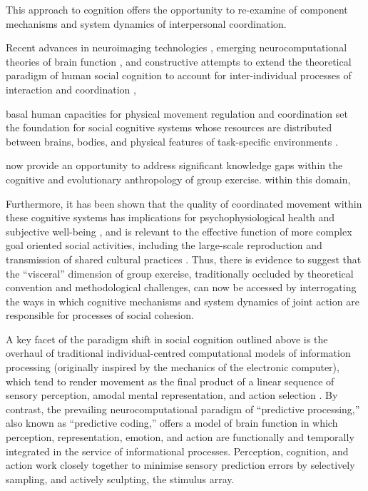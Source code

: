 \begin{CJK}{UTF8}{gbsn}
{This approach to cognition offers the opportunity to re-examine of component mechanisms and system dynamics of interpersonal coordination.


Recent advances in neuroimaging technologies \citep{Frith2007}, emerging neurocomputational theories of brain function \citep{Friston2010,Frith2010,Clark2013}, and constructive attempts to extend the theoretical paradigm of human social cognition to account for inter-individual processes of interaction and coordination \citep{Sebanz2006,Dale2014},

 basal human capacities for physical movement regulation and coordination set the foundation for social cognitive systems whose resources are distributed between brains, bodies, and physical features of task-specific environments \citep{Hutchins2000,Kirsh2006,Semin2008,Semin2012,Coey2012}.



now provide an opportunity to address significant knowledge gaps within the cognitive and evolutionary anthropology of group exercise.   within this domain,


Furthermore, it has been shown that the quality of coordinated movement within these cognitive systems has implications for psychophysiological health and subjective well-being \citep{Wheatley2012}, and is relevant to the effective function of more complex goal oriented social activities, including the large-scale reproduction and transmission of shared cultural practices \citep{Dunbar2012,Roepstorff2010,Claidiere2014,Launay2016}. Thus, there is evidence to suggest that the ``visceral'' dimension of group exercise, traditionally occluded by theoretical convention and methodological challenges, can now be accessed by interrogating the ways in which cognitive mechanisms and system dynamics of joint action are responsible for processes of social cohesion.

A key facet of the paradigm shift in social cognition outlined above is the overhaul of traditional individual-centred computational models of information processing (originally inspired by the mechanics of the electronic computer), which tend to render movement as the final product of a linear sequence of sensory perception, amodal mental representation, and action selection \citep{Lewis2005}.  By contrast, the prevailing neurocomputational paradigm of ``predictive processing,'' also known as ``predictive coding,'' \citep[see][]{Frith2007,Kilner2009,Clark2013} offers a model of brain function in which perception, representation, emotion, and action are functionally and temporally integrated in the service of informational processes.  Perception, cognition, and action work closely together to minimise sensory prediction errors by selectively sampling, and actively sculpting, the stimulus array.







}
\end{CJK}
